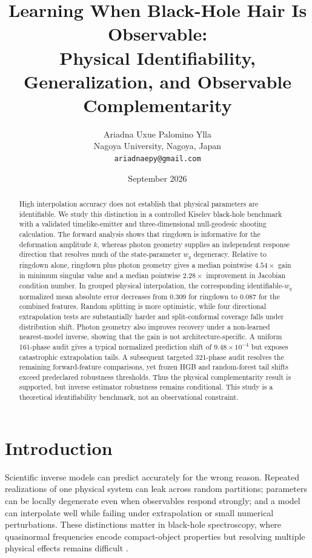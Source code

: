 \documentclass[11pt]{article}
\title{Learning When Black-Hole Hair Is Observable:\\Physical Identifiability, Generalization, and Observable Complementarity}
\author{Ariadna Uxue Palomino Ylla\\Nagoya University, Nagoya, Japan\\\texttt{ariadnaepy@gmail.com}}
\date{September 2026}
\newcommand{\wq}{w_q}
\begin{document}
\maketitle

\begin{abstract}
High interpolation accuracy does not establish that physical parameters are
identifiable. We study this distinction in a controlled Kiselev black-hole
benchmark with a validated timelike-emitter and three-dimensional null-geodesic
shooting calculation. The forward analysis shows that ringdown is informative
for the deformation amplitude $k$, whereas photon geometry supplies an
independent response direction that resolves much of the state-parameter
$\wq$ degeneracy. Relative to ringdown alone, ringdown plus photon geometry
gives a median pointwise $4.54\times$ gain in minimum singular value and a
median pointwise $2.28\times$ improvement in Jacobian condition number. In
grouped physical interpolation,
the corresponding identifiable-$\wq$ normalized mean absolute error decreases
from 0.309 for ringdown to 0.087 for the combined features. Random splitting is
more optimistic, while four directional extrapolation tests are substantially
harder and split-conformal coverage falls under distribution shift. Photon
geometry also improves recovery under a non-learned nearest-model inverse,
showing that the gain is not architecture-specific. A uniform
161-phase audit gives a typical normalized prediction shift of
$9.48\times10^{-4}$ but exposes catastrophic extrapolation tails. A subsequent
targeted 321-phase audit resolves the remaining forward-feature comparisons,
yet frozen HGB and random-forest tail shifts exceed predeclared robustness
thresholds. Thus the physical complementarity result is supported, but inverse
estimator robustness remains conditional. This study is a theoretical
identifiability benchmark, not an observational constraint.
\end{abstract}

\section{Introduction}
Scientific inverse models can predict accurately for the wrong reason. Repeated
realizations of one physical system can leak across random partitions;
parameters can be locally degenerate even when observables respond strongly;
and a model can interpolate well while failing under extrapolation or small
numerical perturbations. These distinctions matter in black-hole spectroscopy,
where quasinormal frequencies encode compact-object properties but resolving
multiple physical effects remains difficult \cite{dreyer2004spectroscopy,berti2006spectroscopy,bhagwat2019overtones}.
\end{document}
